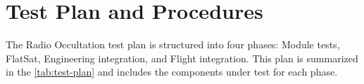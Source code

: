 %
%
%
%
%

%
%
%
%
%
%

\chapter{Test Plan and Procedures} \label{ch:test-plan}

The Radio Occultation test plan is structured into four phases: Module tests, FlatSat, Engineering integration, and Flight integration. This plan is summarized in the \autoref{tab:test-plan} and includes the components under test for each phase. 

